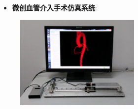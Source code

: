 
\begin{frame}
\begin{itemize}
  \item \textbf{微创血管介入手术仿真系统}: 
\end{itemize}
\begin{figure}[t]
\centering
\includegraphics[height=130pt]{../../Figures/background/simulator.eps}
\end{figure}
% 
\end{frame}

